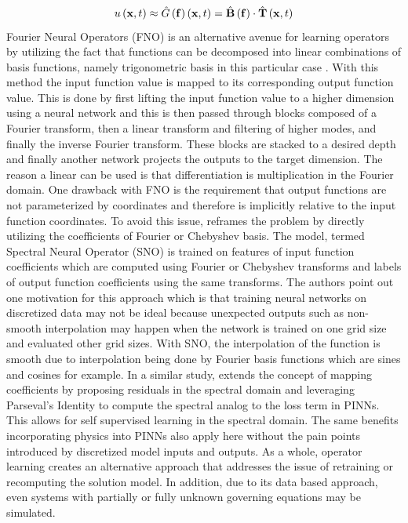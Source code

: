\begin{equation}\label{eq:universal_op_approx_nn}
    u\left( \vb{x}, t \right) \approx \hat{G}\left( \vb{f} \right)\left( \vb{x}, t \right) = \hat{\vb{B}}\left( \vb{f} \right) \cdot \hat{\vb{T}}\left( \vb{x}, t \right)
\end{equation}
Fourier Neural Operators (FNO) is an alternative avenue for learning operators by utilizing the fact that functions can be decomposed into linear combinations of basis functions, namely trigonometric basis in this particular case \autocite{li2021fourier}. With this method the input function value is mapped to its corresponding output function value. This is done by first lifting the input function value to a higher dimension using a neural network and this is then passed through blocks composed of a Fourier transform, then a linear transform and filtering of higher modes, and finally the inverse Fourier transform. These blocks are stacked to a desired depth and finally another network projects the outputs to the target dimension. The reason a linear can be used is that differentiation is multiplication in the Fourier domain. One drawback with FNO is the requirement that output functions are not parameterized by coordinates and therefore is implicitly relative to the input function coordinates. To avoid this issue, \textcite{fanaskovSpectralNeuralOperators2023} reframes the problem by directly utilizing the coefficients of Fourier or Chebyshev basis. The model, termed Spectral Neural Operator (SNO) is trained on features of input function coefficients which are computed using Fourier or Chebyshev transforms and labels of output function coefficients using the same transforms. The authors point out one motivation for this approach which is that training neural networks on discretized data may not be ideal because unexpected outputs such as non-smooth interpolation may happen when the network is trained on one grid size and evaluated other grid sizes. With SNO, the interpolation of the function is smooth due to interpolation being done by Fourier basis functions which are sines and cosines for example. In a similar study, \textcite{du2024neural} extends the concept of mapping coefficients by proposing residuals in the spectral domain and leveraging Parseval's Identity to compute the spectral analog to the loss term in PINNs. This allows for self supervised learning in the spectral domain. The same benefits incorporating physics into PINNs also apply here without the pain points introduced by discretized model inputs and outputs. As a whole, operator learning creates an alternative approach that addresses the issue of retraining or recomputing the solution model. In addition, due to its data based approach, even systems with partially or fully unknown governing equations may be simulated.

